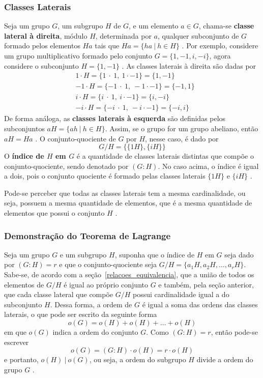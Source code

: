 \subsubsection{Classes Laterais}
Seja um grupo \(G\), um subgrupo \(H\) de \(G\), e um elemento \(a \in G\), chama-se \textbf{classe lateral à direita}, módulo \(H\), determinada por \(a\), qualquer subconjunto de \(G\) formado pelos elementos \(Ha\) tais que \(Ha = \{ha\ |\  h \in H\}\) \cite{Gilbert:2004}. Por exemplo, considere um grupo multiplicativo formado pelo conjunto \(G = \{1, -1, i, -i\}\), agora considere o subconjunto \(H = \{1, -1\}\) \cite{Domingues:2003}. As classes laterais à direita são dadas por
\begin{align*}
  &1\cdot H = \{1\ \cdot\ 1,\ 1 \cdot -1\} = \{1, -1\} \\
  &-1\cdot H = \{-1\ \cdot\ 1,\ -1 \cdot -1\} = \{-1, 1\} \\
  &i\cdot H = \{i\ \cdot\ 1,\ i \cdot -1\} = \{i, -i\} \\
  &-i\cdot H = \{-i\ \cdot\ 1,\ -i \cdot -1\} = \{-i, i\}
\end{align*}
De forma análoga, as \textbf{classes laterais à esquerda} são definidas pelos subconjuntos \(aH = \{ah\ |\ h \in H\}\). Assim, se o grupo for um grupo abeliano, então \(aH = Ha\) \cite{Domingues:2003}.
O conjunto-quociente de \(G\) por \(H\), nesse caso, é dado por
$$
  G / H = \{\{1H\}, \{iH\}\}
$$
O \textbf{índice de \(H\) em \(G\)} é a quantidade de classes laterais distintas que compõe o conjunto-quociente, sendo denotado por \((G : H)\). No caso acima, o índice é igual a dois, pois o conjunto quociente é formado pelas classes laterais \(\{1H\}\) e \(\{iH\}\) \cite{Domingues:2003}.

Pode-se perceber que todas as classes laterais tem a mesma cardinalidade, ou seja, possuem a mesma quantidade de elementos, que é a mesma quantidade de elementos que possui o conjunto \(H\) \cite{Shoup:2005}.

%
%
\subsubsection{Demonstração do Teorema de Lagrange}
Seja um grupo \(G\) e um subgrupo \(H\), suponha que o índice de \(H\) em \(G\) seja dado por \((G : H) = r\) e que o conjunto-quociente seja \(G / H = \{a_1H, a_2H, \ldots, a_rH\}\). Sabe-se, de acordo com a seção~\ref{relacoes_equivalencia}, que a união de todos os elementos de \(G/H\) é igual ao próprio conjunto \(G\) e também, pela seção anterior, que cada classe lateral que compõe \(G/H\) possui cardinalidade igual a do subconjunto \(H\). Dessa forma, a ordem de \(G\) é igual a soma das ordens das classes laterais, o que pode ser escrito da seguinte forma
$$
  o(G) = o(H) + o(H) + \ldots + o(H)
$$
em que \(o(G)\) indica a ordem do conjunto \(G\). Como \((G : H) = r\), então pode-se escrever
$$
  o(G) = (G : H)\cdot o(H) = r\cdot o(H)
$$
e portanto, \(o(H)\ |\ o(G)\), ou seja, a ordem do subgrupo \(H\) divide a ordem do grupo \(G\) \cite{Domingues:2003}.
%
%
